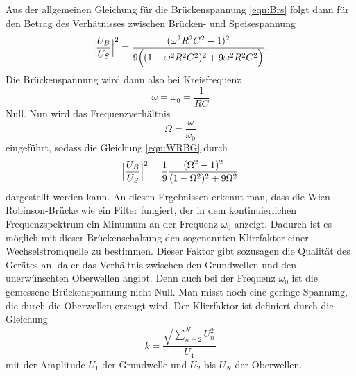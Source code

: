 Aus der allgemeinen Gleichung für die Brückenspannung \eqref{eqn:Brs}
folgt dann für den Betrag des Verhätnisses zwischen Brücken- und Speisespannung
\begin{equation}
  \Bigl|\frac{U_B}{U_S}\Bigr|^2 = \frac{(\omega^2 R^2 C^2 -1)^2}{9\Bigl
  ((1-\omega^2 R^2 C^2)^2 + 9 \omega^2 R^2 C^2\Bigr)} .
  \label{eqn:WRBG}
\end{equation}
Die Brückenspannung wird dann also bei Kreisfrequenz
\begin{equation}
  \omega = \omega_0 = \frac{1}{RC}
\end{equation}
Null.
Nun wird das Frequenzverhältnis
\begin{equation}
  \Omega = \frac{\omega}{\omega_0}
\end{equation}
eingeführt, sodass die Gleichung \eqref{eqn:WRBG} durch
\begin{equation}
    \Bigl|\frac{U_B}{U_S}\Bigr|^2 = \frac{1}{9} \frac{(\Omega^2-1)^2}
    {(1-\Omega^2)^2 + 9\Omega^2}
\end{equation}
dargestellt werden kann.
An diesen Ergebnissen erkennt man, dass die Wien-Robinson-Brücke wie ein
Filter fungiert, der in dem kontinuierlichen Frequenzspektrum ein Minumum
an der Frequenz $\omega_0$ anzeigt. Dadurch ist es möglich mit dieser
Brückenschaltung den sogenannten Klirrfaktor einer Wechselstromquelle zu
bestimmen. Dieser Faktor gibt sozusagen die Qualität des Gerätes an, da er das
Verhältnis zwischen den Grundwellen und den unerwünschten Oberwellen angibt.
Denn auch bei der Frequenz $\omega_0$ ist die gemessene Brückenspannung nicht
Null. Man misst noch eine geringe Spannung, die durch die Oberwellen erzeugt
wird. Der Klirrfaktor ist definiert durch die Gleichung
\begin{equation}
  k = \frac{\sqrt{\sum_{n=2}^N U_n^2}}{U_1}
  \label{eqn:klirrf}
\end{equation}
mit der Amplitude $U_1$ der Grundwelle und $U_2$ bis $U_N$ der Oberwellen.
